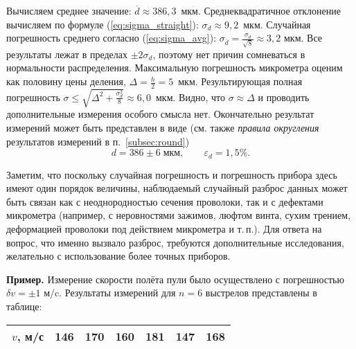\documentclass[10pt]{article}
\begin{document}
{\footnotesize{}Вычисляем среднее значение: $\overline{d}\approx386{,}3$~мкм.
Среднеквадратичное отклонение вычисляем по формуле (\ref{eq:sigma_straight}):
$\sigma_{d}\approx9{,}2$~мкм. Случайная погрешность среднего согласно
(\ref{eq:sigma_avg}): $\sigma_{\overline{d}}=\frac{\sigma_{d}}{\sqrt{8}}\approx3{,}2$
мкм. Все результаты лежат в пределах $\pm2\sigma_{d}$, поэтому нет
причин сомневаться в нормальности распределения. Максимальную погрешность
микрометра оценим как половину цены деления, $\Delta=\frac{h}{2}=5$~мкм.
Результирующая полная погрешность $\sigma\le\sqrt{\Delta^{2}+\frac{\sigma_{d}^{2}}{8}}\approx6{,}0$~мкм.
Видно, что $\sigma\approx\Delta$ и проводить дополнительные измерения
особого смысла нет. Окончательно результат измерений может быть представлен
в виде (см. также }\emph{\footnotesize{}правила округления}{\footnotesize{}
результатов измерений в п.~\ref{subsec:round})
\[
d=386\pm6\;\text{мкм},\qquad\varepsilon_{d}=1{,}5\%.
\]
}{\footnotesize\par}

{\footnotesize{}Заметим, что поскольку случайная погрешность и погрешность
прибора здесь имеют один порядок величины, наблюдаемый случайный разброс
данных может быть связан как с неоднородностью сечения проволоки,
так и с дефектами микрометра (например, с неровностями зажимов, люфтом
винта, сухим трением, деформацией проволоки под действием микрометра
и т.\,п.). Для ответа на вопрос, что именно вызвало разброс, требуются
дополнительные исследования, желательно с использование более точных
приборов.}{\footnotesize\par}

\textbf{\footnotesize{}Пример.}{\footnotesize{} Измерение скорости
полёта пули было осуществлено с погрешностью $\delta v=\pm1$ м/c.
Результаты измерений для $n=6$ выстрелов представлены в таблице:}{\footnotesize\par}

{\footnotesize{}}%
\begin{tabular}{|c|c|c|c|c|c|c|}
\hline 
{\footnotesize{}$v$, м/с} & {\footnotesize{}146} & {\footnotesize{}170} & {\footnotesize{}160} & {\footnotesize{}181} & {\footnotesize{}147} & {\footnotesize{}168}\tabularnewline
\hline 
\end{tabular}{\footnotesize\par}
\end{document}
